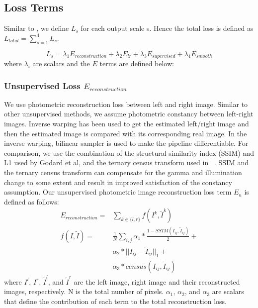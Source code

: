 \documentclass[letterpaper, 10 pt, conference]{ieeeconf}
\begin{document}
\subsection{Loss Terms}
Similar to \cite{godard2017unsupervised}, we define $L_{s}$ for each output scale s. Hence the total loss is defined as $L_{total}=\sum_{s=1}^{4}{L_{s}}$. 

\begin {equation}
L_{s} = \lambda_{1}E_{reconstruction} +\lambda_{2}E_{lr}  +\lambda_{3}E_{supervised} +\lambda_{4}E_{smooth}  
\end{equation}
where $\lambda_{i}$ are scalars and the $E$ terms are defined below:

\subsubsection{Unsupervised Loss $E_{reconstruction}$}
We use photometric reconstruction loss between left and right image. Similar to other unsupervised methods, we assume photometric constancy between left-right images. Inverse warping has been used to get the estimated left/right image and then the estimated image is compared with its corresponding real image. In the inverse warping, bilinear sampler is used to make the pipeline differentiable. For comparison, we use the combination of the structural similarity index (SSIM) and L1 used by Godard et al\cite{godard2017unsupervised}, and the ternary census transform used in ~\cite{meister2018unflow,zabih1994non,stein2004efficient}. SSIM and the ternary census transform can compensate for the gamma and illumination change to some extent and result in improved satisfaction of the constancy assumption. Our unsupervised photometric image reconstruction loss term $E_{u}$ is defined as follows:
\begin{equation}
\begin{split}
E_{reconstruction}= &\sum_{k \in \{l,r\}}f(I^{k},\tilde{I}^{k})\\
f(I,\tilde{I})=&\frac{1}{N}\sum\limits_{i,j} \alpha_{1}*\frac{1- SSIM(I_{ij},\tilde{I}_{ij})}{2} + \\
&\alpha_{2} * ||I_{ij} - \tilde{I}_{ij} ||_{1}+ \\
 &\alpha_{3} * census(I_{ij},\tilde{I}_{ij})
\end{split}
\end{equation}
where $I^{l}$, $I^{r}$, $\tilde{I}^{l}$, and $\tilde{I}^{r}$  are the left image, right image and their reconstructed images, respectively. N is the total number of pixels. $\alpha_{1}$, $\alpha_{2}$, and $\alpha_{3}$ are scalars that define the contribution of each term to the total reconstruction loss.\\
\\
\end{document}
